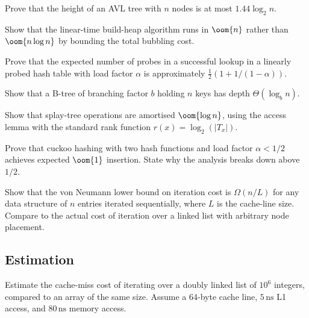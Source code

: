 \begin{exercise}
Prove that the height of an AVL tree with $n$ nodes is at most $1.44 \log_2 n$.
\end{exercise}

\begin{exercise}
Show that the linear-time build-heap algorithm runs in $\oom{n}$ rather than $\oom{n \log n}$ by bounding the total bubbling cost.
\end{exercise}

\begin{exercise}
Prove that the expected number of probes in a successful lookup in a linearly probed hash table with load factor $\alpha$ is approximately $\tfrac{1}{2}(1 + 1/(1 - \alpha))$.
\end{exercise}

\begin{exercise}
Show that a B-tree of branching factor $b$ holding $n$ keys has depth $\Theta(\log_b n)$.
\end{exercise}

\begin{exercise}
Show that splay-tree operations are amortised $\oom{\log n}$, using the access lemma with the standard rank function $r(x) = \log_2(|T_x|)$.
\end{exercise}

\begin{exercise}
Prove that cuckoo hashing with two hash functions and load factor $\alpha < 1/2$ achieves expected $\oom{1}$ insertion. State why the analysis breaks down above $1/2$.
\end{exercise}

\begin{exercise}
Show that the von Neumann lower bound on iteration cost is $\Omega(n / L)$ for any data structure of $n$ entries iterated sequentially, where $L$ is the cache-line size. Compare to the actual cost of iteration over a linked list with arbitrary node placement.
\end{exercise}

\subsection*{Estimation}

\begin{exercise}
Estimate the cache-miss cost of iterating over a doubly linked list of $10^6$ integers, compared to an array of the same size. Assume a $64$-byte cache line, $5\,\si{\nano\second}$ L1 access, and $80\,\si{\nano\second}$ memory access.
\end{exercise}


